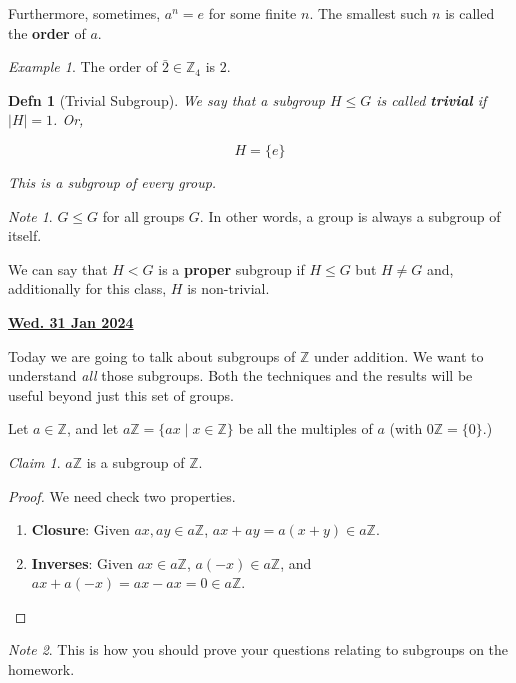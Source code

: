 \documentclass[12pt]{article}
\renewcommand{\date}[1]{\underline{\bf #1}}
\def\Z{{\mathbb Z}}
\newtheorem{definition}{Defn}
\theoremstyle{remark}
\theoremstyle{remark}
\newtheorem{claim}{Claim}
\theoremstyle{remark}
\newtheorem{example}{Example}
\theoremstyle{remark}
\theoremstyle{remark}
\newtheorem*{note}{Note}
\begin{document}
Furthermore, sometimes, $a^n = e$ for some finite $n$. The smallest such $n$ is
called the {\bf order} of $a$.

\begin{example}
	The order of $\bar 2 \in \Z_4$ is $2$.
\end{example}

\begin{definition}[Trivial Subgroup]
	We say that a subgroup $H \le G$ is called {\bf trivial} if $|H| = 1$. Or,

	\[
		H = \{e\}
	\]

	This is a subgroup of {\it every group}.
\end{definition}

\begin{note}
	$G \le G$ for all groups $G$. In other words, a group is always a subgroup of
	itself.

	We can say that $H < G$ is a {\bf proper} subgroup if $H \le G$ but $H \ne G$
	and, additionally for this class, $H$ is non-trivial.
\end{note}

\date{Wed. 31 Jan 2024}

Today we are going to talk about subgroups of $\Z$ under addition. We want to
understand {\it all} those subgroups. Both the techniques and the results will
be useful beyond just this set of groups.

Let $a \in \Z$, and let $a \Z = \{ ax \mid x \in \Z \}$ be all the multiples of
$a$ (with $0 \Z = \{ 0 \}$.)

\begin{claim}
  $a \Z$ is a subgroup of $\Z$.
\end{claim}

\begin{proof}
  We need check two properties.

  \begin{enumerate}
    \item {\bf Closure}: Given $ax, ay \in a \Z$, $ax + ay = a(x + y) \in a\Z$.
    \item {\bf Inverses}: Given $ax \in a \Z$, $a(-x) \in a\Z$, and $ax + a(-x) =
            ax - ax = 0 \in a\Z$.
  \end{enumerate}
\end{proof}

\begin{note}
	This is how you should prove your questions relating to subgroups on the
	homework.
\end{note}
\end{document}
